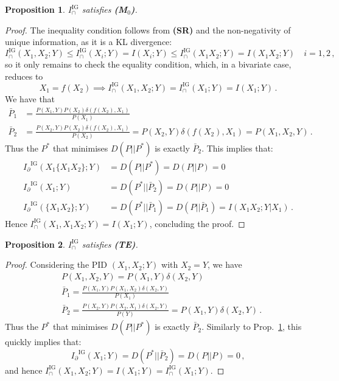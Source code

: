 \documentclass{article}
\newcommand{\ts}[1]{\ensuremath{_{\text{#1}}}}
\newcommand{\Ip}{\ensuremath{I_\partial}\xspace}
\newcommand{\SR}{\textbf{(SR)}\xspace} %
\newcommand{\Mz}{\textbf{(M\ts{0})}\xspace} %
\newcommand{\TE}{\textbf{(TE)}\xspace} %
\newcommand{\IIG}{\ensuremath{I_\cap^{\text{IG}}}\xspace}
\newcommand{\IIGs}{\ensuremath{I_\cap^{\text{IG}}(X_1,X_2;Y)}\xspace}
\newtheorem{proposition}{Proposition}
\begin{document}
\begin{proposition} \label{prop:IG-Mz}
    $\IIG$ satisfies \Mz.
\end{proposition}
\begin{proof}
    The inequality condition follows from \SR and the non-negativity of unique information, as it is a KL divergence:
    \begin{equation}
        \IIGs \leq \IIG(X_i;Y)=I(X_i;Y) \leq \IIG(X_1 X_2;Y)=I(X_1 X_2;Y) \quad i=1,2\,,
    \end{equation}
    so it only remains to check the equality condition, which, in a bivariate case, reduces to 
    \begin{equation}
        X_1 = f(X_2) \implies \IIG(X_1,X_2;Y)=\IIG(X_1;Y)=I(X_1;Y) \,.    
    \end{equation}
    We have that
    \begin{align}
        \bar{P}_1 & = \frac{P(X_1,Y)P(X_2)\delta(f(X_2),X_1)}{P(X_1)} \\
        \bar{P}_2 & = \frac{P(X_2,Y)P(X_2)\delta(f(X_2),X_1)}{P(X_2)} = P(X_2,Y)\delta(f(X_2),X_1) = P(X_1,X_2,Y) \,.
    \end{align}
    Thus the $P^*$ that minimises $D(P||P^*)$ is exactly $\bar{P}_2$. This implies that:
    \begin{align}
        \Ip^\text{IG}(X_1\{X_1 X_2\};Y)& = D(P||P^*) = D(P||P)=0 \\
        \Ip^\text{IG}(X_1;Y) & = D(P^*||\bar{P}_2) = D(P||P) = 0 \\
        \Ip^\text{IG}(\{X_1X_2\};Y) & = D(P^*||\bar{P}_1) = D(P||\bar{P}_1) = I(X_1X_2;Y|X_1) \,.
    \end{align}
    Hence $\IIG(X_1,X_1X_2;Y)= I(X_1;Y)$, concluding the proof.
\end{proof}
    
    
\begin{proposition} \label{prop:IG-TE}
    $\IIG$ satisfies \TE.
\end{proposition}
\begin{proof}
    Considering the PID $(X_1,X_2;Y)$ with $X_2=Y$, we have
    \begin{align}
        & P(X_1,X_2,Y) = P(X_1,Y)\delta(X_2,Y) \\[0.3em]
        & \bar{P}_1 = \frac{P(X_1,Y)P(X_1,X_2)\delta(X_2,Y)}{P(X_1)} \\
        & \bar{P}_2 = \frac{P(X_2,Y)P(X_2,X_1)\delta(X_2,Y)}{P(Y)} = P(X_1,Y)\delta(X_2,Y) \,.
    \end{align}
    Thus the $P^*$ that minimises $D(P||P^*)$ is exactly $\bar{P}_2$. Similarly to Prop.~\ref{prop:IG-Mz}, this quickly implies that:
    \begin{equation}
        \Ip^\text{IG}(X_1;Y) = D(P^*||\bar{P}_2) = D(P||P) = 0 \,,
    \end{equation}
    and hence $\IIG(X_1,X_2;Y)=I(X_1;Y)=\IIG(X_1;Y)$.
    
\end{proof}
\end{document}
